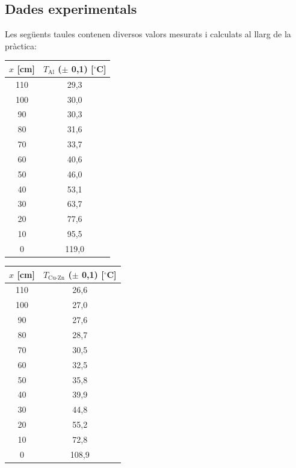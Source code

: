 \documentclass[12pt,twosides,onecolumn,openany]{article}
\newenvironment{Figura}
  {\par\medskip\noindent\minipage{\linewidth}}
  {\endminipage\par\medskip}
\begin{document}
\begin{multicols}{2}
    \subsection{Dades experimentals}
    Les següents taules contenen diversos valors mesurats i calculats al llarg de la pràctica:
    \begin{Figura}
      \centering
      \begin{tabular}{c|c}
        $x$ [cm] & $T_{\text{Al}}$ ($\pm$ 0,1) [$^\circ$C]\\\hline \hline
        110 & 29,3 \\
        100 & 30,0 \\
        90 &  30,3 \\
        80 &  31,6\\
        70 &  33,7\\
        60 &  40,6\\
        50 &  46,0\\
        40 &  53,1\\
        30 &  63,7\\
        20 &  77,6\\
        10 &  95,5\\
        0 &  119,0\\
      \end{tabular}
    \end{Figura}
    \begin{Figura}
      \centering
      \begin{tabular}{c|c}
        $x$ [cm] & $T_{\text{Cu-Zn}}$ ($\pm$ 0,1) [$^\circ$C]\\\hline \hline
        110 & 26,6\\
        100 & 27,0\\
        90 &  27,6\\
        80 &  28,7\\
        70 &  30,5\\
        60 &  32,5\\
        50 &  35,8\\
        40 &  39,9\\
        30 &  44,8\\
        20 &  55,2\\
        10 &  72,8\\
        0 &  108,9\\

\end{tabular}
\end{Figura}
\end{multicols}
\end{document}
